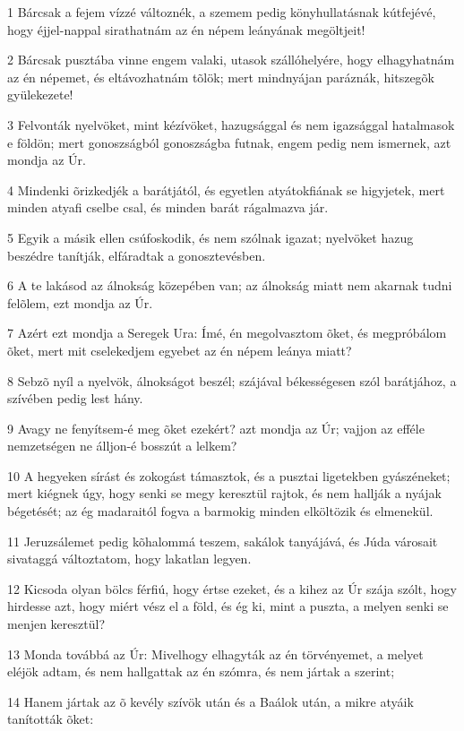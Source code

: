 \par 1 Bárcsak a fejem vízzé változnék, a szemem pedig könyhullatásnak kútfejévé, hogy éjjel-nappal sirathatnám az én népem leányának megöltjeit!
\par 2 Bárcsak pusztába vinne engem valaki, utasok szállóhelyére, hogy elhagyhatnám az én népemet, és eltávozhatnám tõlök; mert mindnyájan paráznák, hitszegõk gyülekezete!
\par 3 Felvonták nyelvöket, mint kézívöket, hazugsággal és nem igazsággal hatalmasok e földön; mert gonoszságból gonoszságba futnak, engem pedig nem ismernek, azt mondja az Úr.
\par 4 Mindenki õrizkedjék a barátjától, és egyetlen atyátokfiának se higyjetek, mert minden atyafi cselbe csal, és minden barát rágalmazva jár.
\par 5 Egyik a másik ellen csúfoskodik, és nem szólnak igazat; nyelvöket hazug beszédre tanítják, elfáradtak a gonosztevésben.
\par 6 A te lakásod az álnokság közepében van; az álnokság miatt nem akarnak tudni felõlem, ezt mondja az Úr.
\par 7 Azért ezt mondja a Seregek Ura: Ímé, én megolvasztom õket, és megpróbálom õket, mert mit cselekedjem egyebet az én népem leánya miatt?
\par 8 Sebzõ nyíl a nyelvök, álnokságot beszél; szájával békességesen szól barátjához, a szívében pedig lest hány.
\par 9 Avagy ne fenyítsem-é meg õket ezekért? azt mondja az Úr; vajjon az efféle nemzetségen ne álljon-é bosszút a lelkem?
\par 10 A hegyeken sírást és zokogást támasztok, és a pusztai ligetekben gyászéneket; mert kiégnek úgy, hogy senki se megy keresztül rajtok, és nem hallják a nyájak bégetését; az ég madaraitól fogva a barmokig minden elköltözik és elmenekül.
\par 11 Jeruzsálemet pedig kõhalommá teszem, sakálok tanyájává, és Júda városait sivataggá változtatom, hogy lakatlan legyen.
\par 12 Kicsoda olyan bölcs férfiú, hogy értse ezeket, és a kihez az Úr szája szólt, hogy hirdesse azt, hogy miért vész el a föld, és ég ki, mint a puszta, a melyen senki se menjen keresztül?
\par 13 Monda továbbá az Úr: Mivelhogy elhagyták az én törvényemet, a melyet eléjök adtam, és nem hallgattak az én szómra, és nem jártak a szerint;
\par 14 Hanem jártak az õ kevély szívök után és a Baálok után, a mikre atyáik tanították õket:
